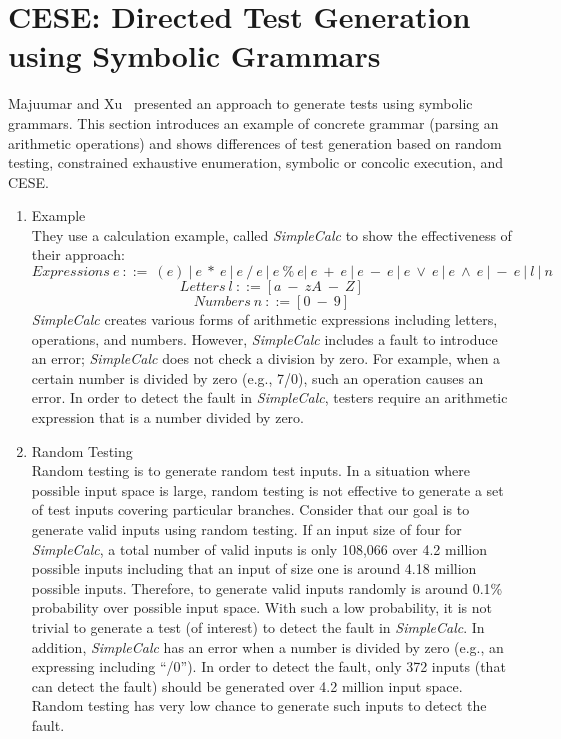 \section{CESE: Directed Test Generation using Symbolic Grammars}

Majuumar and Xu~\cite{CESE} presented an approach to generate
tests using symbolic grammars. This section introduces
an example of concrete grammar (parsing an arithmetic
operations) and shows differences of test generation
based on random testing,  constrained exhaustive enumeration,
symbolic or concolic execution, and CESE.
 
 \begin{enumerate}  
  \item{Example} \\
They use a calculation example, called \textit{SimpleCalc} to show the effectiveness
of their approach:
\[Expressions~e~::=~(e)~|~e~*~e~|~e~/~e~|~e~\%~e |~e~+~e~|~e~-~e~|~e~\vee~e~|~e~\wedge~e~|~-~e~|~l~|~n\]
\[Letters~l~::= [a~-~zA~-~Z]\]
\[Numbers~n~::= [0~-~9]\]
\textit{SimpleCalc} creates various forms of arithmetic expressions
including letters, operations, and numbers. However, \textit{SimpleCalc} includes
a fault to introduce an error; \textit{SimpleCalc} does
not check a division by zero. For example, when a certain
number is divided by zero (e.g., 7/0), such an operation
causes an error. In order to detect the fault in \textit{SimpleCalc},
testers require an arithmetic expression that is a number divided by zero.  

  \item{Random Testing}\\

Random testing is to generate random test inputs. In a situation where possible input space is large, random testing is not effective to generate a set of test inputs covering particular branches. Consider that our goal is to generate valid inputs using random testing. If an input size of four for \textit{SimpleCalc}, a total number of valid inputs is only 108,066 over 4.2 million possible inputs including that an input of size one is around 4.18 million possible inputs. Therefore, to generate valid inputs randomly is around 0.1\% probability over possible input space. With such a low probability, it is not trivial to generate a test (of interest) to detect the fault in \textit{SimpleCalc}. In addition, \textit{SimpleCalc} has an error when a number is divided by zero (e.g., an expressing including ``/0''). In order to detect the fault, only 372 inputs (that can detect the fault) should be generated over 4.2 million input space. Random testing has very low chance to generate such inputs to detect the fault.
  

\end{enumerate}
